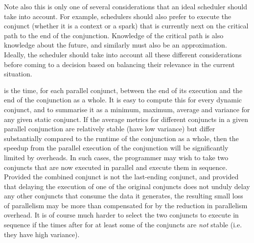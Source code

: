 Note also this is only one of several considerations
that an ideal scheduler should take into account.
For example, schedulers should also prefer to execute the conjunct
(whether it is a context or a spark)
that is currently next on the critical path to the end of the conjunction.
Knowledge of the critical path is also knowledge about the future,
and similarly must also be an approximation.
Ideally, the scheduler should take into account
all these different considerations before coming to a decision
based on balancing their relevance in the current situation.




is the time, for each parallel conjunct,
between the end of its execution and the end of the conjunction as a whole.
It is easy to compute this for every dynamic conjunct,
and to summarise it as a minimum, maximum, average and variance
for any given static conjunct.
If the average  metrics
for different conjuncts in a given parallel conjunction
are relatively stable (have low variance)
but differ substantially compared to the runtime of the conjunction as a whole,
then the speedup from the parallel execution of the conjunction
will be significantly limited by overheads.
In such cases, the programmer may wish to take
two conjuncts that are now executed in parallel
and execute them in sequence.
Provided the combined conjunct is not the last-ending conjunct,
and provided that delaying the execution of one of the original conjuncts
does not unduly delay any other conjuncts that consume the data it generates,
the resulting small loss of parallelism
may be more than compensated for
by the reduction in parallelism overhead.
It is of course much harder
to select the two conjuncts to execute in sequence
if the times after for at least some of the conjuncts
are \emph{not} stable (i.e. they have high variance).

